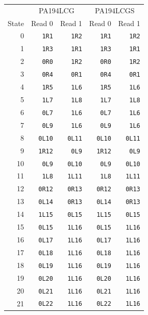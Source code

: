 \begingroup\small
\setlength{\tabcolsep}{14pt}
\begin{longtable}{rrrrr}
\toprule & \multicolumn{2}{c}{PA194LCG} & \multicolumn{2}{c}{PA194LCGS}\\
State & Read 0 & Read 1 & Read 0 & Read 1\\\midrule\endhead
0 & \texttt{1R1} & \texttt{1R2} & \texttt{1R1} & \texttt{1R2}\\
1 & \texttt{1R3} & \texttt{1R1} & \texttt{1R3} & \texttt{1R1}\\
2 & \texttt{0R0} & \texttt{1R2} & \texttt{0R0} & \texttt{1R2}\\
3 & \texttt{0R4} & \texttt{0R1} & \texttt{0R4} & \texttt{0R1}\\
4 & \texttt{1R5} & \texttt{1L6} & \texttt{1R5} & \texttt{1L6}\\
5 & \texttt{1L7} & \texttt{1L8} & \texttt{1L7} & \texttt{1L8}\\
6 & \texttt{0L7} & \texttt{1L6} & \texttt{0L7} & \texttt{1L6}\\
7 & \texttt{0L9} & \texttt{1L6} & \texttt{0L9} & \texttt{1L6}\\
8 & \texttt{0L10} & \texttt{0L11} & \texttt{0L10} & \texttt{0L11}\\
9 & \texttt{1R12} & \texttt{0L9} & \texttt{1R12} & \texttt{0L9}\\
10 & \texttt{0L9} & \texttt{0L10} & \texttt{0L9} & \texttt{0L10}\\
11 & \texttt{1L8} & \texttt{1L11} & \texttt{1L8} & \texttt{1L11}\\
12 & \texttt{0R12} & \texttt{0R13} & \texttt{0R12} & \texttt{0R13}\\
13 & \texttt{0L14} & \texttt{0R13} & \texttt{0L14} & \texttt{0R13}\\
14 & \texttt{1L15} & \texttt{0L15} & \texttt{1L15} & \texttt{0L15}\\
15 & \texttt{0L15} & \texttt{1L16} & \texttt{0L15} & \texttt{1L16}\\
16 & \texttt{0L17} & \texttt{1L16} & \texttt{0L17} & \texttt{1L16}\\
17 & \texttt{0L18} & \texttt{1L16} & \texttt{0L18} & \texttt{1L16}\\
18 & \texttt{0L19} & \texttt{1L16} & \texttt{0L19} & \texttt{1L16}\\
19 & \texttt{0L20} & \texttt{1L16} & \texttt{0L20} & \texttt{1L16}\\
20 & \texttt{0L21} & \texttt{1L16} & \texttt{0L21} & \texttt{1L16}\\
21 & \texttt{0L22} & \texttt{1L16} & \texttt{0L22} & \texttt{1L16}\\

\end{longtable}
